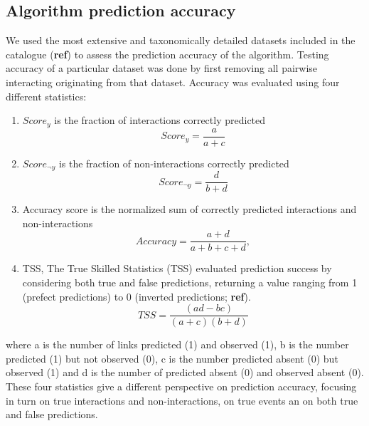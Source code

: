 \documentclass[letterpaper]{article}
\begin{document}
\subsection{Algorithm prediction accuracy}
We used the most extensive and taxonomically detailed datasets included in the catalogue (\textbf{ref}) to assess the prediction accuracy of the algorithm. Testing accuracy of a particular dataset was done by first removing all pairwise interacting originating from that dataset. Accuracy was evaluated using four different statistics:
\begin{enumerate}
 \item $Score_y$ is the fraction of interactions correctly predicted
     \begin{equation}
         Score_y = \frac{a}{a + c}
     \end{equation}

 \item $Score_{\neg y}$ is the fraction of non-interactions correctly predicted
     \begin{equation}
       Score_{\neg y}  = \frac{d}{b + d}
     \end{equation}

 \item Accuracy score is the normalized sum of correctly predicted interactions and non-interactions
     \begin{equation}
       Accuracy = \frac{a + d}{a + b + c + d},
     \end{equation}
 \item TSS, The True Skilled Statistics (TSS) evaluated prediction success by considering both true and false predictions, returning a value ranging from 1 (prefect predictions) to 0 (inverted predictions; \textbf{ref}). %
     \begin{equation}
       TSS = \frac{(ad - bc)}{(a + c)(b + d)}
     \end{equation}

\end{enumerate}

where a is the number of links predicted (1) and observed (1), b is the number predicted (1) but not observed (0), c is the number predicted absent (0) but observed (1) and d is the number of predicted absent (0) and observed absent (0). These four statistics give a different perspective on prediction accuracy, focusing in turn on true interactions and non-interactions, on true events an on both true and false predictions.
\end{document}
